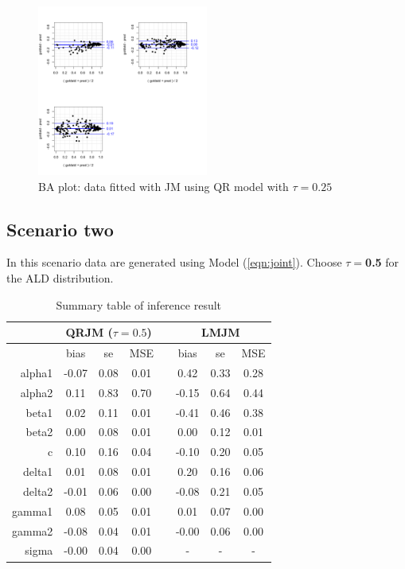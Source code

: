 \documentclass{article}
\begin{document}
\begin{figure}[H]
\centering
\includegraphics[width=0.5\textwidth]{ba_QRJM_qt25.pdf}
\caption{BA plot: data fitted with JM using QR model with $\tau=0.25$}
\end{figure}

\subsection{Scenario two}
In this scenario data are generated using Model (\ref{eqn:joint}). Choose $\tau= ${\bf 0.5} for the ALD distribution.


\begin{table}[H]
\centering
\caption{Summary table of inference result}
\begin{tabular}{rccccccc}
  \hline
& \multicolumn{3}{c}{QRJM ($\tau=0.5$)} & & \multicolumn{3}{c}{LMJM}\\
\hline
 & bias & se & MSE & & bias & se & MSE \\
 \cline{2-4}  \cline{6-8}
alpha1 & -0.07 & 0.08 & 0.01 & & 0.42 & 0.33 & 0.28 \\
  alpha2 & 0.11 & 0.83 & 0.70 & & -0.15 & 0.64 & 0.44 \\
  beta1 & 0.02 & 0.11 & 0.01 & & -0.41 & 0.46 & 0.38 \\
  beta2 & 0.00 & 0.08 & 0.01 & & 0.00 & 0.12 & 0.01 \\
  c & 0.10 & 0.16 & 0.04 & & -0.10 & 0.20 & 0.05 \\
  delta1 & 0.01 & 0.08 & 0.01 & & 0.20 & 0.16 & 0.06 \\
  delta2 & -0.01 & 0.06 & 0.00 & & -0.08 & 0.21 & 0.05 \\
  gamma1 & 0.08 & 0.05 & 0.01 & & 0.01 & 0.07 & 0.00 \\
  gamma2 & -0.08 & 0.04 & 0.01 & & -0.00 & 0.06 & 0.00 \\
  sigma & -0.00 & 0.04 & 0.00 & & - & - & - \\
   \hline
\end{tabular}
\end{table}
\end{document}
